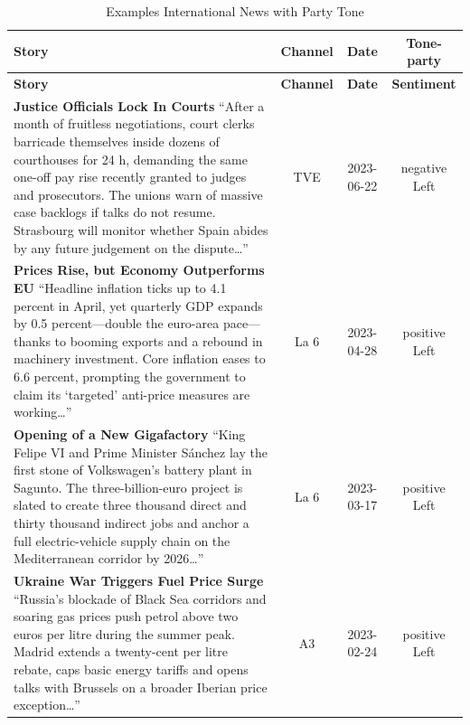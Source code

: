 \documentclass[12pt]{article}
\begin{document}
\label{tab:examples_stories}


\begin{center}


\begin{longtable}{|p{8cm}|c|c|c|}
\caption{Examples International News with Party Tone}\\
	\hline
	\textbf{Story} & \textbf{Channel} & \textbf{Date} & \textbf{Tone-party} \\
	\hline
	\endfirsthead
	\hline
	\textbf{Story} & \textbf{Channel} & \textbf{Date} & \textbf{Sentiment} \\
	\hline
	\endhead
	
	\textbf{Justice Officials Lock In Courts}\newline
	{\scriptsize“After a month of fruitless negotiations, court clerks barricade themselves inside dozens of courthouses for 24 h, demanding the same one-off pay rise recently granted to judges and prosecutors.  The unions warn of massive case backlogs if talks do not resume.  Strasbourg will monitor whether Spain abides by any future judgement on the dispute…”}
	& TVE & 2023-06-22 & negative Left\\
	\hline
	
	\textbf{Prices Rise, but Economy Outperforms EU}\newline
	{\scriptsize“Headline inflation ticks up to 4.1 percent in April, yet quarterly GDP expands by 0.5 percent—double the euro-area pace—thanks to booming exports and a rebound in machinery investment.  Core inflation eases to 6.6 percent, prompting the government to claim its ‘targeted’ anti-price measures are working…”}
	& La 6 & 2023-04-28 & positive Left\\
	\hline
	
	\textbf{Opening of a New Gigafactory }\newline
	{\scriptsize“King Felipe VI and Prime Minister Sánchez lay the first stone of Volkswagen’s battery plant in Sagunto.  The three-billion-euro project is slated to create three thousand direct and thirty thousand indirect jobs and anchor a full electric-vehicle supply chain on the Mediterranean corridor by 2026…”}
	& La 6 & 2023-03-17 & positive Left\\
	\hline
	
	\textbf{Ukraine War Triggers Fuel Price Surge}\newline
	{\scriptsize“Russia’s blockade of Black Sea corridors and soaring gas prices push petrol above two euros per litre during the summer peak.  Madrid extends a twenty-cent per litre rebate, caps basic energy tariffs and opens talks with Brussels on a broader Iberian price exception…”}
	& A3 & 2023-02-24 & positive Left\\
	\hline
	

\end{longtable}
\end{center}
\end{document}
